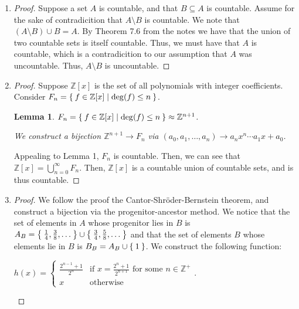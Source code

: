 \documentclass[12pt]{article}
\newtheorem{lemma}{Lemma}
\begin{document}
\begin{enumerate}[start = 1, label = {\bfseries Question \arabic*}, leftmargin=1in]
\item\begin{proof}
    Suppose a set $A$ is countable, and that $B\subseteq A$ is countable. Assume for the sake of contradicition that $A\setminus B$ is countable. We note that $(A\setminus B) \cup B = A$. By Theorem 7.6 from the notes
    we have that the union of two countable sets is itself countable. Thus, we must have that $A$ is countable, which is a contradicition to our assumption that $A$
    was uncountable. Thus, $A\setminus B$ is uncountable.
\end{proof}
\item\begin{proof}
    Suppose $\mathbb{Z}[x]$ is the set of all polynomials with integer coefficients. Consider $F_n=\Set{f\in \mathbb{Z}[x]| \deg(f)\leq n}$.\begin{lemma}
        $F_n=\Set{f\in \mathbb{Z}[x]| \deg(f)\leq n}\approx \mathbb{Z}^{n+1}$.\upshape \par
        We construct a bijection $\mathbb{Z}^{n+1}\to F_n$ via $(a_0, a_1,\ldots,a_n)\to a_n{x^n}\cdots a_1{x}+a_0$.
    \end{lemma} Appealing to Lemma 1, $F_n$ is countable. Then, we can see that $\mathbb{Z}[x]=\bigcup\limits_{n=0}^{\infty}F_n$. Then, $\mathbb{Z}[x]$ is a countable union of countable sets, and is thus countable.
\end{proof}
\item\begin{proof}
    We follow the proof the Cantor-Shröder-Bernstein theorem, and construct a bijection via the progenitor-ancestor method. We notice that the set of elements in $A$ whose progenitor lies in $B$ is $A_B = \Set{\frac{1}{4}, \frac{3}{8},\ldots}\cup \Set{\frac{3}{4},\frac{5}{8},\ldots}$ and 
    that the set of elements $B$ whose elements lie in $B$ is $B_B=A_B \cup \Set{1}$. We construct the following function:\begin{center}
        $h(x)=\begin{cases}
            \frac{2^{n-1}+1}{2^n} & \text{if } x=\frac{2^n+1}{2^{n+1}} \text{ for some } n\in \mathbb{Z}^{+}\\
            x & \text{otherwise}
        \end{cases}$.
    \end{center} 
\end{proof}
\end{enumerate}
\end{document}
